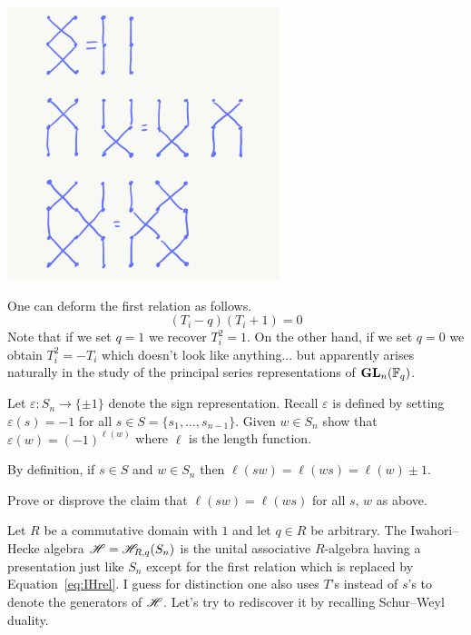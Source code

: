 \documentclass[11pt]{article}
\begin{document}
\includegraphics[height=300px]{theSymmetricGroup.png}

One can deform the first relation as follows.
\begin{equation}
    \label{eq:IHrel}
    (T_i - q)(T_i + 1) = 0 
\end{equation}
Note that if we set $q = 1$ we recover $T_i^2 = 1$. On the other hand, if we set $q = 0$ we obtain $T_i^2 = - T_i$ which doesn't look like anything... but apparently arises naturally in the study of the principal series representations of ${\mathbf{GL}}_n(\mathbb F_q)$. 

\begin{exer}
    Let $\varepsilon : S_n \to \{\pm 1 \}$ denote the sign representation. Recall $\varepsilon$ is defined by setting $\varepsilon(s) = -1$ for all $s\in S = \{s_1,\dots,s_{n-1}\}$. Given $w\in S_n$ show that $\varepsilon(w) = (-1)^{\ell(w)}$ where $\ell$ is the length function. 
\end{exer}

By definition, if $s\in S$ and $w\in S_n$ then $\ell(sw) = \ell(ws) = \ell(w) \pm 1$. 

\begin{exer}
    Prove or disprove the claim that $\ell(sw) = \ell(ws)$ for all $s$, $w$ as above. 
\end{exer}

Let $R$ be a commutative domain with $1$ and let $q\in R$ be arbitrary. The Iwahori--Hecke algebra $\mathscr H = \mathscr H_{R,q}(S_n)$ is the unital associative $R$-algebra having a presentation just like $S_n$ except for the first relation which is replaced by Equation~\ref{eq:IHrel}. I guess for distinction one also uses $T$'s instead of $s$'s to denote the generators of $\mathscr H$. Let's try to rediscover it by recalling Schur--Weyl duality. 
\end{document}
